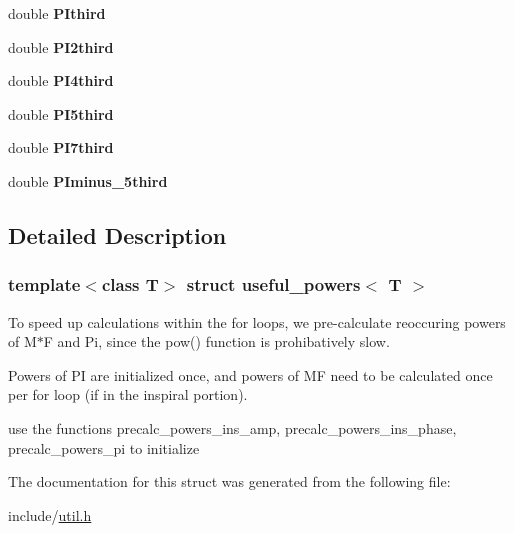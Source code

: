 \begin{DoxyCompactItemize}
\item 
\mbox{\label{structuseful__powers_a4b48e36e3acf84d91a81fe1cc8d9a7a7}} 
double {\bfseries P\+Ithird}
\item 
\mbox{\label{structuseful__powers_acb8ebe3afa5700faabee08772532f11e}} 
double {\bfseries P\+I2third}
\item 
\mbox{\label{structuseful__powers_ab980b3eea9af1225b75450837c6da7ab}} 
double {\bfseries P\+I4third}
\item 
\mbox{\label{structuseful__powers_a844f8ca2f137bdd2bd51bcacb8a11fd0}} 
double {\bfseries P\+I5third}
\item 
\mbox{\label{structuseful__powers_a398b4320fabb77a71a6cfb942ccf4fb8}} 
double {\bfseries P\+I7third}
\item 
\mbox{\label{structuseful__powers_a4053c92711daa53f53a1e46d239cf19e}} 
double {\bfseries P\+Iminus\+\_\+5third}
\end{DoxyCompactItemize}


\subsection{Detailed Description}
\subsubsection*{template$<$class T$>$\newline
struct useful\+\_\+powers$<$ T $>$}

To speed up calculations within the for loops, we pre-\/calculate reoccuring powers of M$\ast$F and Pi, since the pow() function is prohibatively slow. 

Powers of PI are initialized once, and powers of MF need to be calculated once per for loop (if in the inspiral portion).

use the functions precalc\+\_\+powers\+\_\+ins\+\_\+amp, precalc\+\_\+powers\+\_\+ins\+\_\+phase, precalc\+\_\+powers\+\_\+pi to initialize 

The documentation for this struct was generated from the following file\+:\begin{DoxyCompactItemize}
\item 
include/\hyperlink{util_8h}{util.\+h}\end{DoxyCompactItemize}
